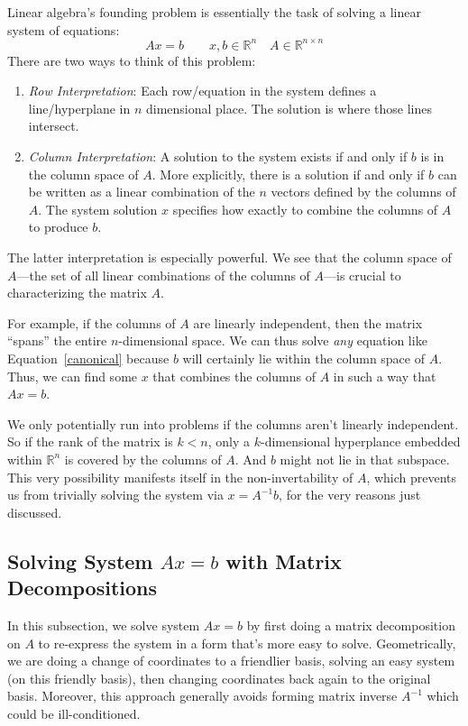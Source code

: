 \documentclass[12pt]{book}
\numberwithin{equation}{section} %
\theoremstyle{plain}
\theoremstyle{definition}
\theoremstyle{remark}
\newcommand{\Rn}{\mathbb{R}^n}
\newcommand{\Rnn}{\mathbb{R}^{n\times n}}
\begin{document}
Linear algebra's founding problem is essentially the task of solving a
linear system of equations:
\begin{equation}
    \label{canonical}
    Ax = b
    \qquad x,b\in \Rn
    \quad A \in \Rnn
\end{equation}
There are two ways to think of this problem:
\begin{enumerate}
  \item {\sl Row Interpretation}:
    Each row/equation in the system defines a line/hyperplane in $n$
    dimensional place. The solution is where those lines intersect.
  \item {\sl Column Interpretation}:
    A solution to the system exists if and only if $b$ is in the
    column space of $A$. More explicitly, there is a solution if and
    only if $b$ can be written as a linear combination of the $n$
    vectors defined by the columns of $A$.
    The system solution $x$ specifies how exactly to combine the columns
    of $A$ to produce $b$.
\end{enumerate}
The latter interpretation is especially powerful. We see that the column
space of $A$---the set of all linear combinations of the columns of
$A$---is crucial to characterizing the matrix $A$.

For example, if the columns of $A$ are linearly independent, then the
matrix ``spans'' the entire $n$-dimensional space. We can thus solve
\emph{any} equation like Equation~\ref{canonical} because $b$ will
certainly lie within the column space of $A$. Thus, we can find some $x$
that combines the columns of $A$ in such a way that $Ax=b$.

We only potentially run into problems if the columns aren't linearly
independent. So if the rank of the matrix is $k<n$, only a
$k$-dimensional hyperplance embedded within $\mathbb{R}^n$ is covered by
the columns of $A$. And $b$ might not lie in that subspace. This very
possibility manifests itself in the non-invertability of $A$, which
prevents us from trivially solving the system via $x = A^{-1}b$, for the
very reasons just discussed.


\subsection{Solving System $Ax=b$ with Matrix Decompositions}

In this subsection, we solve system $Ax=b$ by first doing a matrix
decomposition on $A$ to re-express the system in a form that's more easy
to solve.
Geometrically, we are doing a change of coordinates to a friendlier
basis, solving an easy system (on this friendly basis), then
changing coordinates back again to the original basis.
Moreover, this approach generally avoids forming matrix inverse $A^{-1}$
which could be ill-conditioned.
\end{document}
